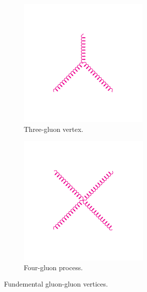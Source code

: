 \begin{figure}[htbp]
  \centering
  \begin{subfigure}{0.45\textwidth}
    \centering
    \includegraphics[width=\textwidth]{qcd_3gluon}
    \caption{Three-gluon vertex.}
    \label{fig:qcd_3gluon}
  \end{subfigure}
  \begin{subfigure}{0.45\textwidth}
    \centering
    \includegraphics[width=\textwidth]{qcd_4gluon}
    \caption{Four-gluon process.}
    \label{fig:qcd_4gluon}
  \end{subfigure}
  \caption{Fundemental gluon-gluon vertices.}\label{fig:qcd_gluon} 
\end{figure}

